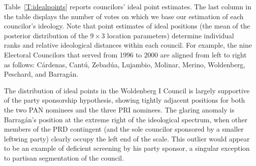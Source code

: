 \documentclass[12 pt, letter]{article}
\begin{document}
Table~\ref{T:idealpoints} reports councilors' ideal point estimates.  The last column in the table displays the number of votes on which we base our estimation of each councilor's ideology. Note that point estimates of ideal positions (the mean of the posterior distribution of the $9 \times 3$ location parameters) determine individual ranks and relative ideological distances within each council.  For example, the nine Electoral Councilors that served from 1996 to 2000 are aligned from left to right as follows: C\'ardenas, Cant\'u, Zebad\'ua, Lujambio, Molinar, Merino, Woldenberg, Peschard, and Barrag\'an.

The distribution of ideal points in the Woldenberg I Council is largely supportive of the party sponsorship hypothesis, showing tightly adjacent positions for both the two PAN nominees and the three PRI nominees.  The glaring anomaly is Barrag\'an's position at the extreme right of the ideological spectrum, when other members of the PRD contingent (and the sole councilor sponsored by a smaller leftwing party) clearly occupy the left end of the scale.  This outlier would appear to be an example of deficient screening by his party sponsor, a singular exception to partisan segmentation of the council.
\end{document}
